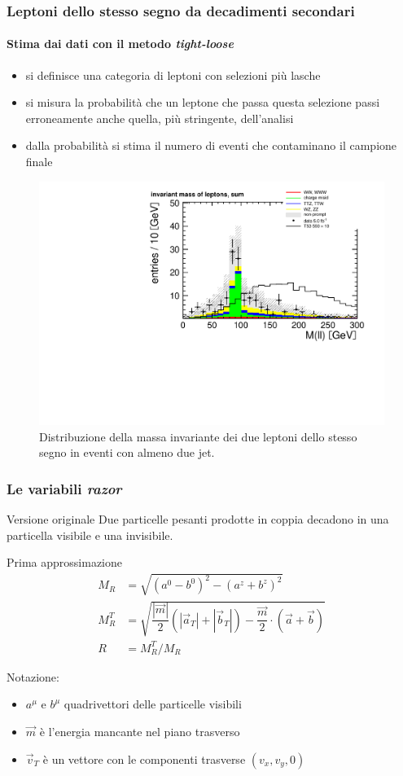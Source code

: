 \documentclass[italian]{beamer}
\begin{document}
\begin{frame}
    \frametitle{Leptoni dello stesso segno da decadimenti secondari}
    \framesubtitle{Stima dai dati con il metodo \emph{tight-loose}}
    \begin{itemize}
        \item si definisce una categoria di leptoni con selezioni pi\`u
            lasche
        \item si misura la probabilit\`a che un leptone che passa questa
            selezione passi erroneamente anche quella, pi\`u stringente, dell'analisi
        \item dalla probabilit\`a si stima il numero di eventi
            che contaminano il campione finale
    \end{itemize}
    \begin{figure}[h]
        \centering
        \includegraphics[width=.5\textwidth]{lep_mass_sum_1}
        \caption{Distribuzione della massa invariante dei due leptoni dello
        stesso segno in eventi con almeno due jet.}
    \end{figure}
\end{frame}

\begin{frame}
    \frametitle{Le variabili \emph{razor}}
    \begin{block}{Versione originale}
        Due particelle pesanti prodotte in coppia decadono in una particella
        visibile e una invisibile.\end{block}
    \begin{block}
        {Prima approssimazione}
        \begin{align*}
            M_R &= \sqrt{(a^0 - b^0)^2 - (a^z + b^z)^2} \\
            M_R^T &= \sqrt{\dfrac{|\vec{m}|}{2} (|\vec{a}_T| + |\vec{b}_T|) 
            -\dfrac{\vec{m}}{2} \cdot (\vec{a} + \vec{b})}\\
            R &= M_R^T / M_R
        \end{align*}
    \end{block}
    Notazione:
    \begin{itemize}
        \item $a^\mu$ e $b^\mu$ quadrivettori delle particelle visibili
        \item $\vec{m}$ \`e l'energia mancante nel piano trasverso \met
        \item $\vec{v}_T$ \`e un vettore con le componenti trasverse $(v_x, v_y, 0)$
    \end{itemize}
\end{frame}
\end{document}
